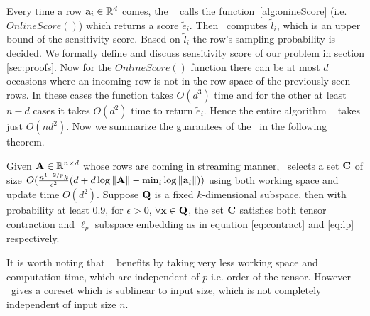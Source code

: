 Every time a row $\mathbf{a}_{i} \in \mathbb{R}^{d}$ comes, the \online~ calls the function~\ref{alg:onineScore} (i.e. $OnlineScore()$) which returns a score $\tilde{e}_{i}$. Then \online~computes $\tilde{l}_{i}$, which is an upper bound of the sensitivity score. Based on $\tilde{l}_{i}$ the row's sampling probability is decided. We formally define and discuss sensitivity score of our problem in section \ref{sec:proofs}.
Now for the $OnlineScore()$ function there can be at most $d$ occasions where an incoming row is not in the row space of the previously seen rows. In these cases the function takes $O(d^{3})$ time and for the other at least $n-d$ cases it takes $O(d^{2})$ time to return $\tilde{e}_{i}$. Hence the entire algorithm \online~ takes just $O(nd^{2})$. Now we summarize the guarantees of the \online~in the following theorem.
\begin{theorem}\label{thm:Online}
Given $\mathbf{A} \in \mathbb{R}^{n \times d}$ whose rows are coming in streaming manner, \online~selects a set $\mathbf{C}$ of size $O(\frac{n^{1-2/p}k}{\epsilon^{2}}(d+d\log\|\mathbf{A}\|-\min_{i} \log \|\mathbf{a}_{i}\|))$ using both working space and update time $O(d^2)$. Suppose $\mathbf{Q}$ is a fixed $k$-dimensional subspace, then with probability at least 0.9, for $\epsilon > 0$, $\forall \mathbf{x} \in \mathbf{Q}$, the set $\mathbf{C}$ satisfies both tensor contraction and $\ell_{p}$ subspace embedding as in equation \eqref{eq:contract} and \eqref{eq:lp} respectively.
\end{theorem}
It is worth noting that \online~ benefits by taking very less working space and computation time, which are independent of $p$ i.e. order of the tensor. However \online~gives a coreset which is sublinear to input size, which is not completely independent of input size $n$.
% 
